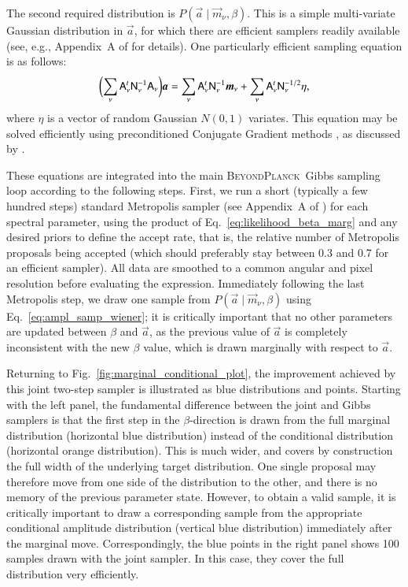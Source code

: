 \documentclass{aa}
\newcommand{\A}[0]{\tens{A}}
\renewcommand{\a}[0]{\vec{a}}
\newcommand{\m}[0]{\vec{m}}
\newcommand{\N}[0]{\tens{N}}
\newcommand{\BP}{\textsc{BeyondPlanck}}
\begin{document}
The second required distribution is $P(\a\mid\m_{\nu},\beta)$. This is a
simple multi-variate Gaussian distribution in $\a$, for which there
are efficient samplers readily available (see, e.g., Appendix~A of
\citealp{bp01} for details). One particularly efficient sampling equation
is as follows:
\begin{align}
  \biggl(\sum_{\nu}\A_{\nu}^t\N_{\nu}^{-1}\A_{\nu}\biggr)\a = \sum_{\nu}\A_{\nu}^t\N_{\nu}^{-1}\m_{\nu} + \sum_{\nu}\A_{\nu}^t\N_{\nu}^{-1/2}\eta,
\label{eq:ampl_samp_wiener}
\end{align}
where $\eta$ is a vector of random Gaussian $N(0,1)$
variates. This equation may be solved efficiently using preconditioned
Conjugate Gradient methods \citep{shewchuk:1994}, as discussed by
\citet{seljebotn:2019}. 

These equations are integrated into the main \BP\ Gibbs sampling loop
according to the following steps. First, we run a short (typically a few hundred steps)
standard Metropolis sampler (see Appendix~A of \citealp{bp01}) for
each spectral parameter, using the product of
Eq.~\eqref{eq:likelihood_beta_marg} and any desired priors to define
the accept rate, that is, the relative number of Metropolis proposals
being accepted (which should preferably stay between 0.3 and 0.7
for an efficient sampler).
All data are smoothed to a common angular and pixel
resolution before evaluating the expression. Immediately following the
last Metropolis step, we draw one sample from $P(\a\mid\m_{\nu},\beta)$
using Eq.~\eqref{eq:ampl_samp_wiener}; it is critically important that
no other parameters are updated between $\beta$ and $\a$, as the
previous value of $\a$ is completely inconsistent with the new $\beta$
value, which is drawn marginally with respect to $\a$.


Returning to Fig.~\ref{fig:marginal_conditional_plot}, the improvement
achieved by this joint two-step sampler is illustrated as blue
distributions and points. Starting with the left panel, the
fundamental difference between the joint and Gibbs samplers is that
the first step in the $\beta$-direction is drawn from the full
marginal distribution (horizontal blue distribution) instead of the
conditional distribution (horizontal orange distribution). This is
much wider, and covers by construction the full width of the
underlying target distribution. One single proposal may therefore move
from one side of the distribution to the other, and there is no memory
of the previous parameter state. However, to obtain a valid sample, it is critically important to draw a corresponding sample from the
appropriate conditional amplitude distribution (vertical blue
distribution) immediately after the marginal move. Correspondingly,
the blue points in the right panel shows 100 samples drawn with the
joint sampler. In this case, they cover the full distribution very
efficiently.
\end{document}
